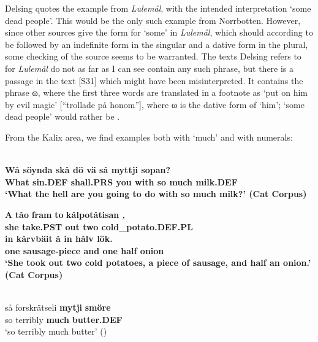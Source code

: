 Delsing quotes the example from \textit{Lulemål}, with the intended interpretation ‘some dead people’. This would be the only such example from Norrbotten. However, since other sources give the form  for ‘some’ in \textit{Lulemål}, which should according to \citet{Nordström1925} be followed by an indefinite form in the singular and a dative form in the plural, some checking of the source seems to be warranted. The texts Delsing refers to for \textit{Lulemål} do not as far as I can see contain any such phrase, but there is a passage in the text [S31] which might have been misinterpreted. It contains the phrase ɷ, where the first three words are translated in a footnote as ‘put on him by evil magic’ [“trollade på honom”], where ɷ is the dative form of ‘him’; ‘some dead people’ would rather be . 

From the Kalix area, we find examples both with ‘much’ and with numerals:

\ea\label{}
\\
\gll \bfseries Wå  söynda  skå  dö  vä  så  myttji  sopan?\\
\bfseries What  sin.DEF  shall.PRS  you  with  so  much  milk.DEF\\
\glt ‘What the hell are you going to do with so \textbf{much milk}?’ (Cat Corpus)

\z

\ea
\gll \textbf{A} \textbf{tåo} \textbf{fram} \textbf{to} \textbf{\textit{  }} \textbf{kålpotåtisan} \textbf{\textit{,}}\\
\bfseries
she  take.PST  out  two  cold\_potato.DEF.PL\\
\gll in  kårvbäit  å  in  hålv  lök.\\
one  sausage-piece  and  one  half  onion\\
\glt ‘She took out two cold potatoes, a piece of sausage, and half an onion.’ (Cat Corpus)

\z

\ea \label{} 
\\
\gll så  forskrätseli  \textbf{mytji} \textbf{smöre}\\
so  terribly  \textbf{much} \textbf{butter.DEF}\\
\glt ‘so terribly much butter’ (\citet{Stenberg1971})

